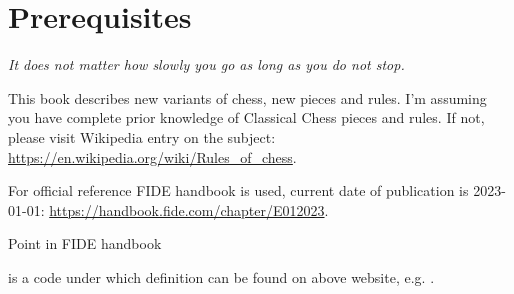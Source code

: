 

\chapter*{Prerequisites}
\label{ch:Prerequisites}

\begin{flushright}
\parbox{0.7\textwidth}{
\emph{It does not matter how slowly you go as long as you do not stop.\newline
{} } }
\end{flushright}

\noindent
This book describes new variants of chess, new pieces and rules. I'm assuming you
have complete prior knowledge of Classical Chess pieces and rules. If not, please
visit Wikipedia entry on the subject:\newline
\href{https://en.wikipedia.org/wiki/Rules\_of\_chess}{https://en.wikipedia.org/wiki/Rules\_of\_chess}.

For official reference \hypertarget{sec:Prerequisites/FIDE Handbook}{FIDE handbook}
is used, current date of publication is 2023-01-01:\newline
\href{https://handbook.fide.com/chapter/E012023}{https://handbook.fide.com/chapter/E012023}.

\hypertarget{sec:Prerequisites/FIDE point}{Point in FIDE handbook} is a code
under which definition can be found on above website, e.g. .


\clearpage %
